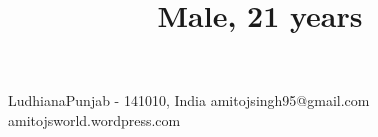 \title{\normalsize Male, 21 years}

\address
    {H.No. 118, Ahluwalia Colony, Jamalpur}{Ludhiana}{Punjab - 141010, India}
\email
    {amitojsingh95@gmail.com}
\homepage
    {amitojsworld.wordpress.com}
